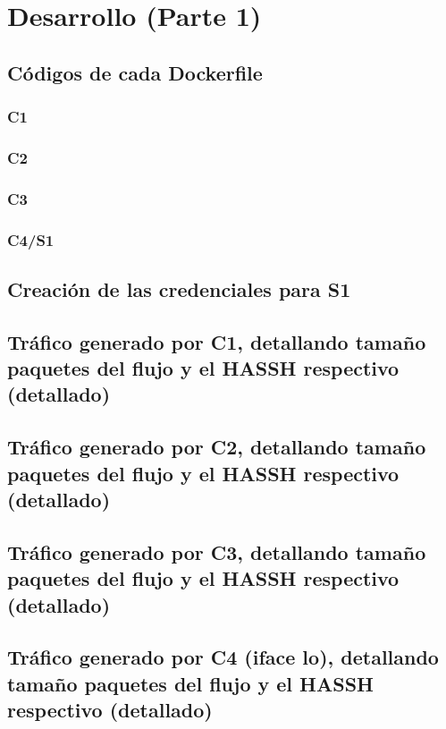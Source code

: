 \documentclass[letter,12pt]{article}
\begin{document}
\section{Desarrollo (Parte 1)}

\subsection{Códigos de cada Dockerfile}
\subsubsection{C1}
\subsubsection{C2}
\subsubsection{C3}
\subsubsection{C4/S1}

\subsection{Creación de las credenciales para S1}

\subsection{Tráfico generado por C1, detallando tamaño paquetes del flujo y el HASSH respectivo (detallado)}

\subsection{Tráfico generado por C2, detallando tamaño paquetes del flujo y el HASSH respectivo (detallado)}

\subsection{Tráfico generado por C3, detallando tamaño paquetes del flujo y el HASSH respectivo (detallado)}

\subsection{Tráfico generado por C4 (iface lo), detallando tamaño paquetes del flujo y el HASSH respectivo (detallado)}
\end{document}
